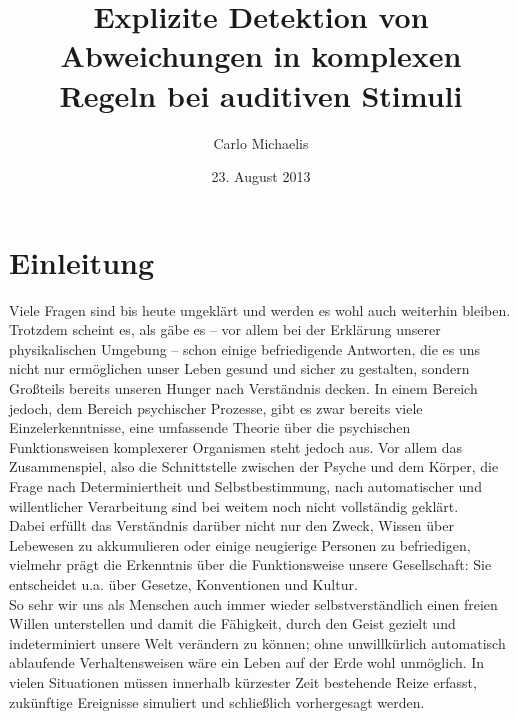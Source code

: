 \documentclass[doc,a4paper,12pt]{apa6}
\title{Explizite Detektion von Abweichungen in komplexen Regeln bei auditiven Stimuli}
\author{Carlo Michaelis}
\date{23. August 2013}
\affiliation{Universität Leipzig}
\begin{document}


\section{Einleitung}

Viele Fragen sind bis heute ungeklärt und werden es wohl auch weiterhin bleiben. Trotzdem scheint es, als gäbe es – vor allem bei der Erklärung unserer physikalischen Umgebung – schon einige befriedigende Antworten, die es uns nicht nur ermöglichen unser Leben gesund und sicher zu gestalten, sondern Großteils bereits unseren Hunger nach Verständnis decken. In einem Bereich jedoch, dem Bereich psychischer Prozesse, gibt es zwar bereits viele Einzelerkenntnisse, eine umfassende Theorie über die psychischen Funktionsweisen komplexerer Organismen steht jedoch aus. Vor allem das Zusammenspiel, also die Schnittstelle zwischen der Psyche und dem Körper, die Frage nach Determiniertheit und Selbstbestimmung, nach automatischer und willentlicher Verarbeitung sind bei weitem noch nicht vollständig geklärt.\\
Dabei erfüllt das Verständnis darüber nicht nur den Zweck, Wissen über Lebewesen zu akkumulieren oder einige neugierige Personen zu befriedigen, vielmehr prägt die Erkenntnis über die Funktionsweise unsere Gesellschaft: Sie entscheidet u.a. über Gesetze, Konventionen und Kultur.\\
So sehr wir uns als Menschen auch immer wieder selbstverständlich einen freien Willen unterstellen und damit die Fähigkeit, durch den Geist gezielt und indeterminiert unsere Welt verändern zu können; ohne unwillkürlich automatisch ablaufende Verhaltensweisen wäre ein Leben auf der Erde wohl unmöglich. In vielen Situationen müssen innerhalb kürzester Zeit bestehende Reize erfasst, zukünftige Ereignisse simuliert und schließlich vorhergesagt werden.
\end{document}
